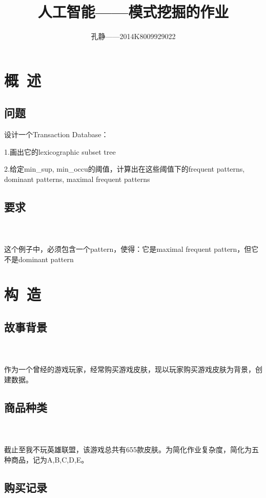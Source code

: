\documentclass{article}
\author{孔静——2014K8009929022}
\title{人工智能——模式挖掘的作业}
\begin{document}
   
	\maketitle
	\tableofcontents
	\section{概\ 述}
		\subsection{问题}
		设计一个Transaction Database：
		
		1.画出它的lexicographic subset tree

		2.给定min\_sup, min\_occu的阈值，计算出在这些阈值下的frequent patterns, dominant patterns, maximal frequent patterns
		
		\subsection{要求}
		\paragraph{\ \ } 这个例子中，必须包含一个pattern，使得：它是maximal frequent pattern，但它不是dominant pattern
	\section{构\ 造}
		\subsection{故事背景}
		\paragraph{\ \ } 作为一个曾经的游戏玩家，经常购买游戏皮肤，现以玩家购买游戏皮肤为背景，创建数据。
		\subsection{商品种类}
		\paragraph{\ \ } 截止至我不玩英雄联盟，该游戏总共有655款皮肤。为简化作业复杂度，简化为五种商品，记为A,B,C,D,E。
		\subsection{购买记录}
\end{document}
